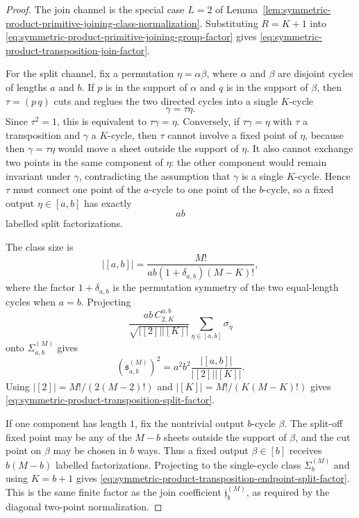\begin{proof}
The join channel is the special case \(L=2\) of
Lemma~\ref{lem:symmetric-product-primitive-joining-class-normalization}.
Substituting \(R=K+1\) into
\eqref{eq:symmetric-product-primitive-joining-group-factor} gives
\eqref{eq:symmetric-product-transposition-join-factor}.

For the split channel, fix a permutation \(\eta=\alpha\beta\), where
\(\alpha\) and \(\beta\) are disjoint cycles of lengths \(a\) and \(b\).
If \(p\) is in the support of \(\alpha\) and \(q\) is in the support of
\(\beta\), then \(\tau=(p\,q)\) cuts and reglues the two directed cycles into
a single \(K\)-cycle
\[
  \gamma=\tau\eta .
\]
Since \(\tau^2=1\), this is equivalent to \(\tau\gamma=\eta\).  Conversely,
if \(\tau\gamma=\eta\) with \(\tau\) a transposition and \(\gamma\) a
\(K\)-cycle, then \(\tau\) cannot involve a fixed point of \(\eta\), because
then \(\gamma=\tau\eta\) would move a sheet outside the support of \(\eta\).
It also cannot exchange two points in the same component of \(\eta\): the
other component would remain invariant under \(\gamma\), contradicting the
assumption that \(\gamma\) is a single \(K\)-cycle.  Hence \(\tau\) must
connect one point of the \(a\)-cycle to one point of the \(b\)-cycle, so a
fixed output \(\eta\in[a,b]\) has exactly
\[
  ab
\]
labelled split factorizations.

The class size is
\[
  |[a,b]|
  =
  \frac{M!}{ab(1+\delta_{a,b})(M-K)!},
\]
where the factor \(1+\delta_{a,b}\) is the permutation symmetry of the two
equal-length cycles when \(a=b\).  Projecting
\[
  \frac{ab\,C_{2,K}^{a,b}}{\sqrt{|[2]||[K]|}}
  \sum_{\eta\in[a,b]}\sigma_\eta
\]
onto \(\Sigma_{a,b}^{(M)}\) gives
\[
  \left(\mathfrak s_{a,b}^{(M)}\right)^2
  =
  a^2b^2\frac{|[a,b]|}{|[2]||[K]|}.
\]
Using \(|[2]|=M!/(2(M-2)!)\) and
\(|[K]|=M!/(K(M-K)!)\) gives
\eqref{eq:symmetric-product-transposition-split-factor}.

If one component has length \(1\), fix the nontrivial output \(b\)-cycle
\(\beta\).  The split-off fixed point may be any of the \(M-b\) sheets outside
the support of \(\beta\), and the cut point on \(\beta\) may be chosen in
\(b\) ways.  Thus a fixed output \(\beta\in[b]\) receives \(b(M-b)\) labelled
factorizations.  Projecting to the single-cycle class \(\Sigma_b^{(M)}\) and
using \(K=b+1\) gives
\eqref{eq:symmetric-product-transposition-endpoint-split-factor}.  This is
the same finite factor as the join coefficient
\(\mathfrak j_b^{(M)}\), as required by the diagonal two-point
normalization.
\end{proof}


